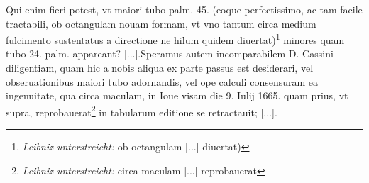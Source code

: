 \pend \pstart [p.~240] Qui enim fieri potest, vt maiori tubo palm. 45. (eoque perfectissimo, ac tam facile tractabili, ob octangulam nouam formam, vt vno tantum circa medium fulcimento sustentatus a directione ne hilum quidem diuertat)\footnote{\textit{Leibniz unterstreicht:} ob octangulam [...] diuertat)} minores quam tubo 24. palm. appareant? [...].\pend \pstart Speramus autem incomparabilem D. Cassini\protect{} diligentiam, quam hic a nobis aliqua ex parte passus est desiderari, vel obseruationibus maiori tubo adornandis, vel ope calculi consensuram ea ingenuitate, qua circa maculam, in Ioue\protect{} visam die 9. Iulij 1665. quam prius, vt supra, reprobauerat\footnote{\textit{Leibniz unterstreicht:} circa maculam [...] reprobauerat} in tabularum editione se retractauit; [...].